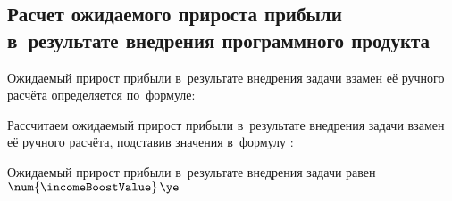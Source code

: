 \subsection{Расчет ожидаемого прироста прибыли в~результате внедрения программного продукта}
\label{sec:economics:icomeBoost}

Ожидаемый прирост прибыли в~результате внедрения задачи взамен её ручного расчёта определяется по~формуле:
\incomeBoostEquation

Рассчитаем ожидаемый прирост прибыли в~результате внедрения задачи взамен её ручного расчёта, подставив значения в~формулу :
\incomeBoostFormulaApplied

Ожидаемый прирост прибыли в~результате внедрения задачи равен \(\num{\incomeBoostValue} \, \ye\)